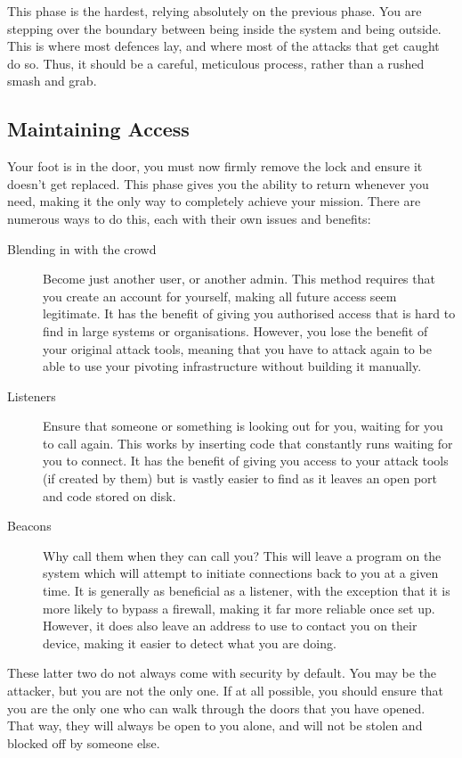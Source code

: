 			This phase is the hardest, relying absolutely on the previous phase.
			You are stepping over the boundary between being inside the system and being outside.
			This is where most defences lay, and where most of the attacks that get caught do so.
			Thus, it should be a careful, meticulous process, rather than a rushed smash and grab.
		\subsection{Maintaining Access}
			Your foot is in the door, you must now firmly remove the lock and ensure it doesn't get replaced.
			This phase gives you the ability to return whenever you need, making it the only way to completely achieve your mission.
			There are numerous ways to do this, each with their own issues and benefits:
			\begin{description}
				\item[Blending in with the crowd] Become just another user, or another admin.
					This method requires that you create an account for yourself, making all future access seem legitimate.
					It has the benefit of giving you authorised access that is hard to find in large systems or organisations.
					However, you lose the benefit of your original attack tools, meaning that you have to attack again to be able to use your pivoting infrastructure without building it manually.
				\item[Listeners] Ensure that someone or something is looking out for you, waiting for you to call again.
					This works by inserting code that constantly runs waiting for you to connect.
					It has the benefit of giving you access to your attack tools (if created by them)
					but is vastly easier to find as it leaves an open port and code stored on disk.
				\item[Beacons] Why call them when they can call you?
					This will leave a program on the system which will attempt to initiate connections back to you at a given time.
					It is generally as beneficial as a listener, with the exception that it is more likely to bypass a firewall,
					making it far more reliable once set up.
					However, it does also leave an address to use to contact you on their device, making it easier to detect what you are doing.
			\end{description}
			These latter two do not always come with security by default.
			You may be the attacker, but you are not the only one.
			If at all possible, you should ensure that you are the only one who can walk through the doors that you have opened.
			That way, they will always be open to you alone, and will not be stolen and blocked off by someone else.

